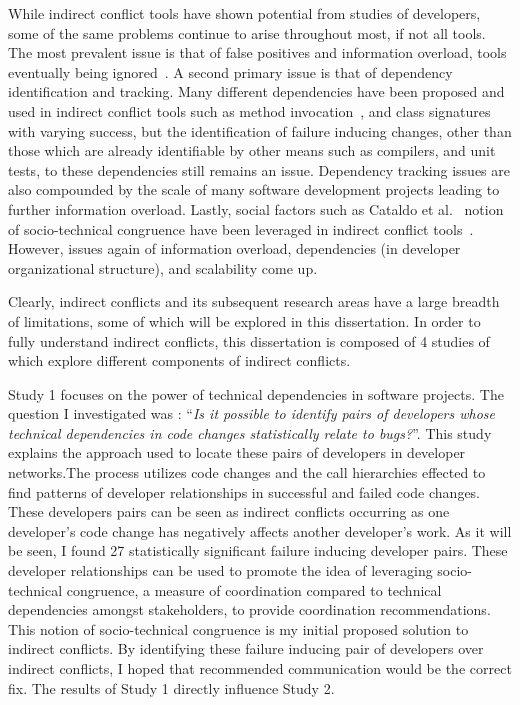 While indirect conflict tools have shown potential from studies of developers, some of the same problems continue
to arise throughout most, if not all tools. The most prevalent issue is that of false positives and information
overload, tools eventually being
ignored~\cite{Sarma:2007:TSA, Servant:2010:CPI}. A second primary issue is that of dependency identification and
tracking. Many different dependencies have been proposed and used in indirect conflict tools such as method 
invocation~\cite{Trainer:2005:BGT}, and class signatures~\cite{Sarma:2007:TSA} with varying success, but the 
identification of failure inducing changes, other than those which are already identifiable by other means such
as compilers, and unit tests, to these dependencies still remains an issue. Dependency tracking issues are
also compounded by the scale of many software development projects leading to further information overload.
Lastly, social factors such as Cataldo et al.~\cite{Cataldo:2006:ICR} notion of socio-technical
congruence have been leveraged in indirect conflict tools~\cite{Kwan:2011:ESC, Begel:2010:CDE, Borici:2012:CHA}.
However, issues again of information overload, dependencies (in developer organizational structure), and scalability 
come up.

Clearly, indirect conflicts and its subsequent research areas have a large breadth of limitations, some of which
will be explored in this dissertation. In order to fully understand indirect conflicts, this dissertation is composed
of 4 studies of which explore different components of indirect conflicts. 

Study 1 focuses on the power of technical dependencies in software projects. The question I
investigated was : ``\textit{Is it possible to identify pairs of developers whose technical dependencies in 
code changes statistically relate to bugs?}''. This study explains the approach used to locate these pairs of developers 
in developer networks.The process utilizes code changes and the call hierarchies effected to find patterns of developer 
relationships in successful and failed code changes. These developers pairs can be seen as indirect conflicts occurring
as one developer's code change has negatively affects another developer's work. As it will be seen, I found 27 statistically significant failure 
inducing developer pairs. These developer relationships can be used to promote the idea of leveraging socio-technical 
congruence, a measure of coordination compared to technical dependencies amongst stakeholders, to provide coordination recommendations.
This notion of socio-technical congruence is my initial proposed solution to indirect conflicts. By identifying these failure
inducing pair of developers over indirect conflicts, I hoped that recommended communication would be the correct fix. The 
results of Study 1 directly influence Study 2.

